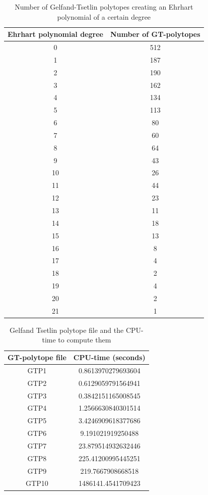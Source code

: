\begin{table}[H]
\caption{Number of Gelfand-Tsetlin polytopes creating an Ehrhart polynomial of a certain degree}
\begin{tabular}{|c|c|}
\toprule
\textbf{Ehrhart polynomial degree} & \textbf{Number of GT-polytopes} \\
\midrule
0 & 512 \\
\hline
1 & 187 \\
\hline
2 & 190 \\
\hline
3 & 162 \\
\hline
4 & 134 \\
\hline
5 & 113 \\
\hline
6 & 80 \\
\hline
7 & 60 \\
\hline
8 & 64 \\
\hline
9 & 43 \\
\hline
10 & 26 \\
\hline
11 & 44 \\
\hline
12 & 23 \\
\hline
13 & 11 \\
\hline
14 & 18 \\
\hline
15 & 13 \\
\hline
16 & 8 \\
\hline
17 & 4 \\
\hline
18 & 2 \\
\hline
19 & 4 \\
\hline
20 & 2 \\
\hline
21 & 1 \\
\bottomrule
\end{tabular}
\label{Tab:ehr-poly}
\end{table}

\begin{table}[ht]
\caption{Gelfand Tsetlin polytope file and the CPU-time to compute them}
\begin{tabular}{|c|c|}
\toprule
\textbf{GT-polytope file} & \textbf{CPU-time (seconds)} \\
\midrule
GTP1 & 0.8613970279693604 \\
\hline
GTP2 & 0.6129059791564941 \\
\hline
GTP3 & 0.3842151165008545 \\
\hline
GTP4 & 1.2566630840301514 \\
\hline
GTP5 & 3.4246909618377686 \\
\hline
GTP6 & 9.191021919250488 \\
\hline
GTP7 & 23.879514932632446 \\
\hline
GTP8 & 225.41200995445251 \\
\hline
GTP9 & 219.7667908668518 \\
\hline
GTP10 & 1486141.4541709423 \\
\bottomrule
\end{tabular}
\label{Tab:cpu-time}
\end{table}
